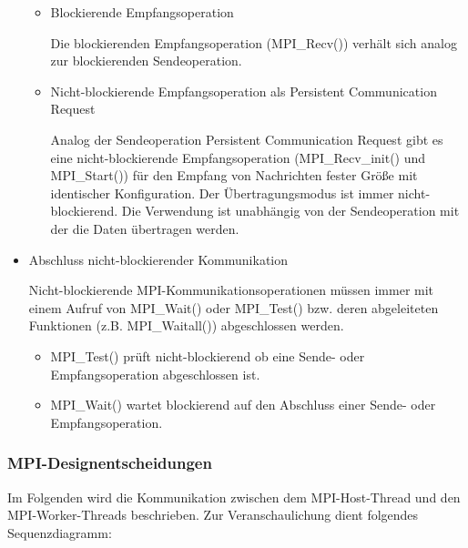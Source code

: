 \begin{itemize}
\begin{itemize}
		\item Blockierende Empfangsoperation
		
		Die blockierenden Empfangsoperation (MPI\_Recv()) verhält sich analog zur blockierenden Sendeoperation.
		
		\item Nicht-blockierende Empfangsoperation als Persistent Communication Request
		
		Analog der Sendeoperation Persistent Communication Request gibt es eine nicht-blockierende Empfangsoperation (MPI\_Recv\_init() und MPI\_Start()) für den Empfang von Nachrichten fester Größe mit identischer Konfiguration. Der Übertragungsmodus ist immer nicht-blockierend. Die Verwendung ist unabhängig von der Sendeoperation mit der die Daten übertragen werden.
		
	\end{itemize}
	
	\item Abschluss nicht-blockierender Kommunikation
	
	Nicht-blockierende MPI-Kommunikationsoperationen müssen immer mit einem Aufruf von MPI\_Wait() oder MPI\_Test() bzw. deren abgeleiteten Funktionen (z.B. MPI\_Waitall()) abgeschlossen werden.
	
	\begin{itemize}
		\item MPI\_Test() prüft nicht-blockierend ob eine Sende- oder Empfangsoperation abgeschlossen ist.
		
		\item MPI\_Wait() wartet blockierend auf den Abschluss einer Sende- oder Empfangsoperation.
	\end{itemize}
	
\end{itemize}

\subsubsection{MPI-Designentscheidungen}
Im Folgenden wird die Kommunikation zwischen dem MPI-Host-Thread und den MPI-Worker-Threads beschrieben. Zur Veranschaulichung dient folgendes Sequenzdiagramm:
\\ \\

